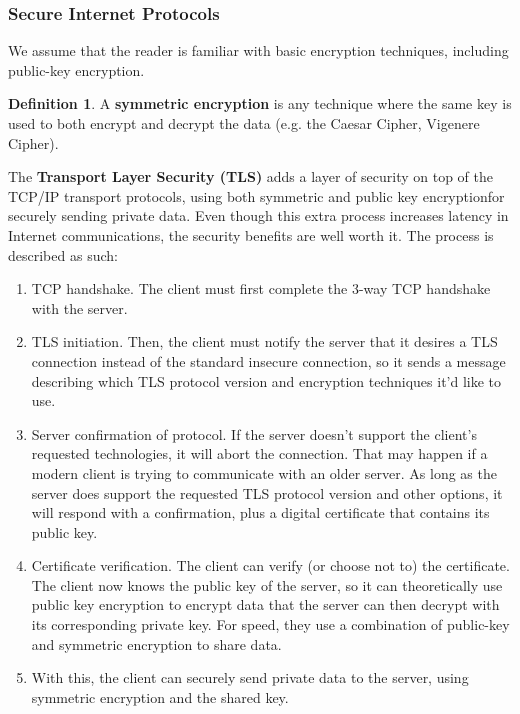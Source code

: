 \documentclass[a4paper, 12pt]{report}
\theoremstyle{remark}
\theoremstyle{definition}
\newtheorem{definition}{Definition}[section]
\begin{document}
\subsubsection{Secure Internet Protocols}
We assume that the reader is familiar with basic encryption techniques, including public-key encryption. 

\begin{definition}
A \textbf{symmetric encryption} is any technique where the same key is used to both encrypt and decrypt the data (e.g. the Caesar Cipher, Vigenere Cipher). 
\end{definition}

The \textbf{Transport Layer Security (TLS)} adds a layer of security on top of the TCP/IP transport protocols, using both symmetric and public key encryptionfor securely sending private data. Even though this extra process increases latency in Internet communications, the security benefits are well worth it. The process is described as such: 
\begin{enumerate}
    \item TCP handshake. The client must first complete the 3-way TCP handshake with the server. 
    \item TLS initiation. Then, the client must notify the server that it desires a TLS connection instead of the standard insecure connection, so it sends a message describing which TLS protocol version and encryption techniques it'd like to use. 
    \item Server confirmation of protocol. If the server doesn't support the client's requested technologies, it will abort the connection. That may happen if a modern client is trying to communicate with an older server. As long as the server does support the requested TLS protocol version and other options, it will respond with a confirmation, plus a digital certificate that contains its public key. 
    \item Certificate verification. The client can verify (or choose not to) the certificate. The client now knows the public key of the server, so it can theoretically use public key encryption to encrypt data that the server can then decrypt with its corresponding private key. For speed, they use a combination of public-key and symmetric encryption to share data.
    \item With this, the client can securely send private data to the server, using symmetric encryption and the shared key. 
\end{enumerate}
\end{document}
